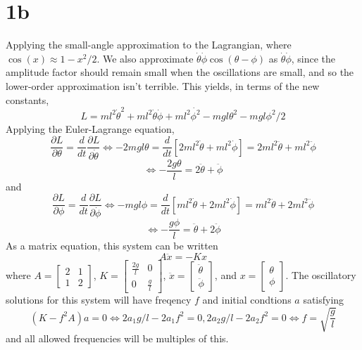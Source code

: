 \documentclass{article}
\begin{document}
\section*{1b}
Applying the small-angle approximation to the Lagrangian, where $\cos(x)\approx 1-x^2/2$. We also approximate $\dot{\theta}\dot{\phi}\cos(\theta-\phi)$ as $\dot{\theta}\dot{\phi}$, since the amplitude factor should remain small when the oscillations are small, and so the lower-order approximation isn't terrible. This yields, in terms of the new constants,
\[L=ml^2\dot{\theta}^2+ml^2\dot{\theta}\dot{\phi}+ml^2\dot{\phi^2}-mgl\theta^2-mgl\phi^2/2\]
Applying the Euler-Lagrange equation,
\[\frac{\partial L}{\partial \theta}=\frac{d}{dt}\frac{\partial L}{\partial\dot{\theta}}\Leftrightarrow -2mgl\theta=\frac{d}{dt}[2ml^2\dot{\theta}+ml^2\dot{\phi}]=2ml^2\ddot{\theta}+ml^2\ddot{\phi}\]
\[\Leftrightarrow -\frac{2g\theta}{l}=2\ddot{\theta}+\ddot{\phi}\]
and
\[\frac{\partial L}{\partial \phi}=\frac{d}{dt}\frac{\partial L}{\partial \dot{\phi}}\Leftrightarrow -mgl\phi=\frac{d}{dt}[ml^2\dot{\theta}+2ml^2\dot{\phi}]=ml^2\ddot{\theta}+2ml^2\ddot{\phi}\]
\[\Leftrightarrow-\frac{g\phi}{l}=\ddot{\theta}+2\ddot{\phi}\]
As a matrix equation, this system can be written
\[A\ddot{x}=-Kx\]
where $A=\begin{bmatrix}
  2 & 1 \\
  1 & 2
\end{bmatrix}$, $K=\begin{bmatrix}
  \frac{2g}{l} & 0\\
  0 & \frac{g}{l}
\end{bmatrix}$, $\ddot{x}=\begin{bmatrix}
  \ddot{\theta} \\ \ddot{\phi}
\end{bmatrix}$, and $x=\begin{bmatrix}
  \theta \\ \phi
\end{bmatrix}$.
The oscillatory solutions for this system will have freqency $f$ and initial condtions $a$ satisfying \[(K-f^2A)a=0\Leftrightarrow 2a_1g/l-2a_1f^2=0, 2a_2g/l-2a_2f^2=0\Leftrightarrow f=\sqrt{\frac{g}{l}}\]
and all allowed frequencies will be multiples of this.
\end{document}
